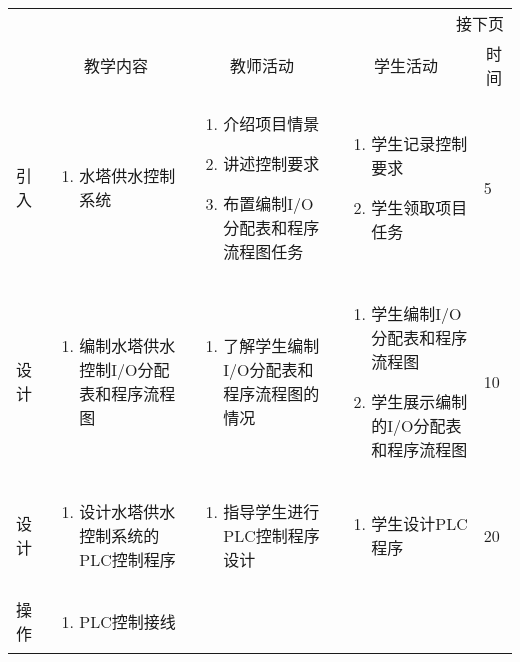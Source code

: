 {\begin{landscape}
\begin{longtable}{|m{10mm}|m{50mm}|m{50mm}|m{50mm}|m{15mm}|}
\multicolumn{5}{r}{\small 接下页}\\
\endfoot
\hline
\endlastfoot
\multicolumn{1}{|c|}{步骤}&\multicolumn{1}{c|}{教学内容}&\multicolumn{1}{c|}{教师活动}&\multicolumn{1}{c|}{学生活动}&\multicolumn{1}{c|}{时间}\\\hline
引入&\begin{enumerate}
\item 水塔供水控制系统
\end{enumerate} &\begin{enumerate}
\item 介绍项目情景
\item 讲述控制要求
\item 布置编制I/O分配表和程序流程图任务
\end{enumerate} &\begin{enumerate}
\item 学生记录控制要求
\item 学生领取项目任务
\end{enumerate} &5 \\\hline
设计&
\begin{enumerate}
\item 编制水塔供水控制I/O分配表和程序流程图
\end{enumerate} &\begin{enumerate}
\item 了解学生编制I/O分配表和程序流程图的情况
\end{enumerate} &\begin{enumerate}
\item 学生编制I/O分配表和程序流程图
\item 学生展示编制的I/O分配表和程序流程图
\end{enumerate} &10 \\\hline
设计&\begin{enumerate}
\item 设计水塔供水控制系统的PLC控制程序
\end{enumerate}
&\begin{enumerate}
\item 指导学生进行PLC控制程序设计
\end{enumerate} &\begin{enumerate}
\item 学生设计PLC程序
\end{enumerate} &20 \\\hline
操作&
\begin{enumerate}
\item PLC控制接线
\end{enumerate} &\begin{enumerate}

\end{enumerate}
\end{longtable}
\end{landscape}}
